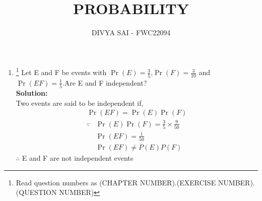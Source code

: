 \documentclass{article}
\providecommand{\pr}[1]{\ensuremath{\Pr\left(#1\right)}}
\newcommand{\solution}{\noindent \textbf{Solution: }}
\begin{document}
\title{PROBABILITY}
\author{\Large DIVYA SAI - FWC22094}
\date{}

\maketitle
\begin{enumerate}[label=13.\arabic{enumi}.\arabic{enumii}]%
\setcounter{enumi}{1}
\setcounter{enumii}{6}

\item \footnote{Read question numbers as (CHAPTER NUMBER).(EXERCISE NUMBER).(QUESTION NUMBER)} { Let E and F be events with $\pr{E}=\frac{3}{5}$,$\pr{F}=\frac{3}{10}$ and $\pr{E F}=\frac{1}{5}$.Are E and F independent?}\\[1ex]
\solution
\\
Two events are said to be independent if,
\begin{align}
&\pr{E F}=\pr{E} \pr{F}&
\end{align}
\begin{align}
\because &\pr{E} \pr{F}=\frac{3}{5} \times \frac{9}{50}&
\\
&\pr{E F}=\frac{1}{50}&
\\
&\pr{E F} \neq P(E) P(F)&
\end{align}
$\therefore$ E and F are not independent events
\end{enumerate}
\end{document}
